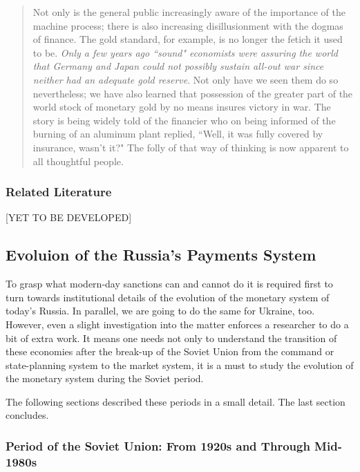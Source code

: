 \begin{quote}
Not only is the general public increasingly aware of the importance of the machine process; there is also increasing disillusionment with the dogmas of finance. The gold standard, for example, is no longer the fetich it used to be. \textit{Only a few years ago ``sound" economists were assuring the world that Germany and Japan could not possibly sustain all-out war since neither had an adequate gold reserve}. Not only have we seen them do so nevertheless; we have also learned that possession of the greater part of the world stock of monetary gold by no means insures victory in war. The story is being widely told of the financier who on being informed of the burning of an aluminum plant replied, ``Well, it was fully covered by insurance, wasn't it?" The folly of that way of thinking is now apparent to all thoughtful people. \citep[pp.~13-14, emphasis added]{ayres1944}
\end{quote}

\subsubsection*{Related Literature}

[\uppercase{Yet to be developed}]

\subsection{Evoluion of the Russia's Payments System}

To grasp what modern-day sanctions can and cannot do it is required first to turn towards institutional details of the evolution of the monetary system of today's Russia. In parallel, we
are going to do the same for Ukraine, too. However, even a slight
investigation into the matter enforces a researcher to do a bit of extra
work. It means one needs not only to understand the transition of these
economies after the break-up of the Soviet Union from the command or
state-planning system to the market system, it is a must to study the
evolution of the monetary system during the Soviet period.

The following sections described these periods in a small detail. The
last section concludes.

\subsubsection{Period of the Soviet Union: From 1920s and Through Mid-1980s}

